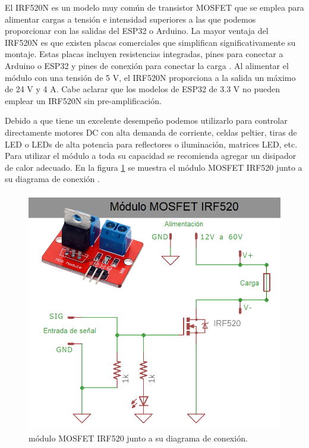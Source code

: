 El IRF520N es un modelo muy común de transistor MOSFET que se emplea para alimentar cargas a tensión e intensidad superiores a las que podemos proporcionar con las salidas del ESP32 o Arduino. La mayor ventaja del IRF520N es que existen placas comerciales que simplifican significativamente su montaje. Estas placas incluyen resistencias integradas, pines para conectar a Arduino o ESP32 y pines de conexión para conectar la carga \citep{WEBSITE:mosfet}. Al alimentar el módulo con una tensión de 5 V, el IRF520N proporciona a la salida un máximo de 24 V y 4 A. Cabe aclarar que los modelos de ESP32 de 3.3 V no pueden emplear un IRF520N sin pre-amplificación.

Debido a que tiene un excelente desempeño podemos utilizarlo para controlar directamente motores DC con alta demanda de corriente, celdas peltier, tiras de LED o LEDs de alta potencia para reflectores o iluminación, matrices LED, etc. Para utilizar el módulo a toda su capacidad se recomienda agregar un disipador de calor adecuado. En la figura \ref{fig:mosfet} se muestra el módulo MOSFET IRF520 junto a su diagrama de conexión \citep{WEBSITE:mosfetesquemna}.

\begin{figure}[ht]
	\centering
	\includegraphics[width=1\textwidth]{./Figures/mosfet.png}
	\caption{módulo MOSFET IRF520 junto a su diagrama de conexión.}
	\label{fig:mosfet}
\end{figure} 


